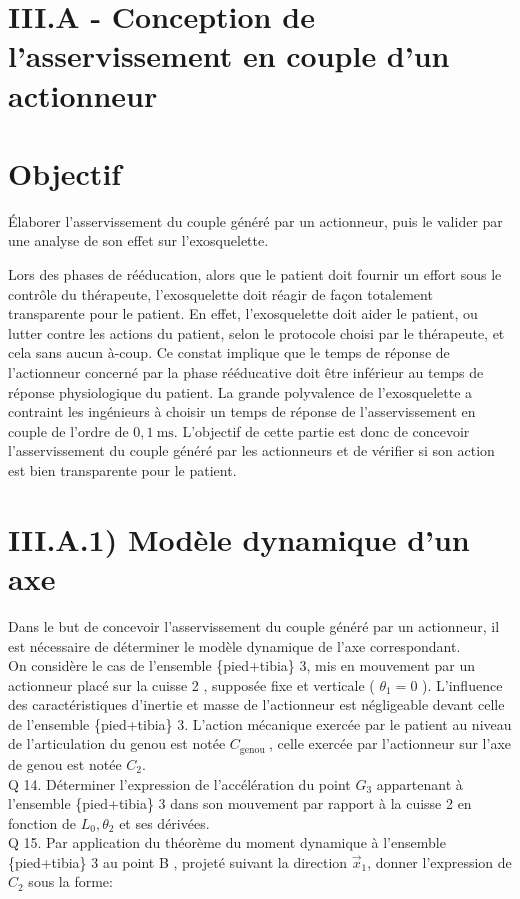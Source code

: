 \documentclass[10pt]{article}
\begin{document}
\section*{III.A - Conception de l'asservissement en couple d'un actionneur}
\section*{Objectif}
Élaborer l'asservissement du couple généré par un actionneur, puis le valider par une analyse de son effet sur l'exosquelette.

Lors des phases de rééducation, alors que le patient doit fournir un effort sous le contrôle du thérapeute, l'exosquelette doit réagir de façon totalement transparente pour le patient. En effet, l'exosquelette doit aider le patient, ou lutter contre les actions du patient, selon le protocole choisi par le thérapeute, et cela sans aucun à-coup. Ce constat implique que le temps de réponse de l'actionneur concerné par la phase rééducative doit être inférieur au temps de réponse physiologique du patient. La grande polyvalence de l'exosquelette a contraint les ingénieurs à choisir un temps de réponse de l'asservissement en couple de l'ordre de $0,1 \mathrm{~ms}$. L'objectif de cette partie est donc de concevoir l'asservissement du couple généré par les actionneurs et de vérifier si son action est bien transparente pour le patient.

\section*{III.A.1) Modèle dynamique d'un axe}
Dans le but de concevoir l'asservissement du couple généré par un actionneur, il est nécessaire de déterminer le modèle dynamique de l'axe correspondant.\\
On considère le cas de l'ensemble \{pied+tibia\} 3, mis en mouvement par un actionneur placé sur la cuisse 2 , supposée fixe et verticale ( $\theta_{1}=0$ ). L'influence des caractéristiques d'inertie et masse de l'actionneur est négligeable devant celle de l'ensemble \{pied+tibia\} 3. L'action mécanique exercée par le patient au niveau de l'articulation du genou est notée $C_{\text {genou }}$, celle exercée par l'actionneur sur l'axe de genou est notée $C_{2}$.\\
Q 14. Déterminer l'expression de l'accélération du point $G_{3}$ appartenant à l'ensemble \{pied+tibia\} 3 dans son mouvement par rapport à la cuisse 2 en fonction de $L_{0}, \theta_{2}$ et ses dérivées.\\
Q 15. Par application du théorème du moment dynamique à l'ensemble \{pied+tibia\} 3 au point B , projeté suivant la direction $\vec{x}_{1}$, donner l'expression de $C_{2}$ sous la forme:
\end{document}
